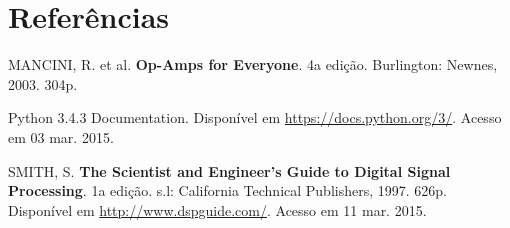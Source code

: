 \chapter{Referências}

MANCINI, R. et al. \textbf{Op-Amps for Everyone}. 4a edição. Burlington: Newnes, 2003. 304p.

Python 3.4.3 Documentation. Disponível em \url{https://docs.python.org/3/}. Acesso em 03 mar. 2015.

SMITH, S. \textbf{The Scientist and Engineer's Guide to Digital Signal Processing}. 1a edição. s.l: California Technical Publishers, 1997. 626p. Disponível em \url{http://www.dspguide.com/}. Acesso em 11 mar. 2015.
